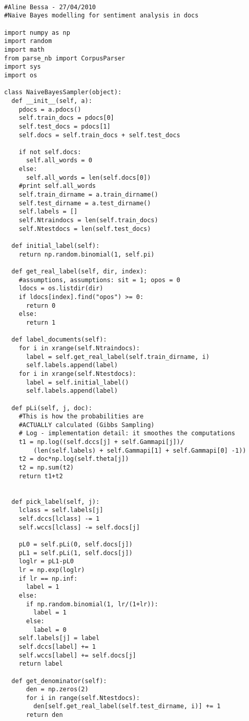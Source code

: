 \begin{lstlisting}

#Aline Bessa - 27/04/2010
#Naive Bayes modelling for sentiment analysis in docs

import numpy as np
import random
import math
from parse_nb import CorpusParser
import sys
import os

class NaiveBayesSampler(object):
  def __init__(self, a):
    pdocs = a.pdocs()
    self.train_docs = pdocs[0]
    self.test_docs = pdocs[1]
    self.docs = self.train_docs + self.test_docs

    if not self.docs: 
      self.all_words = 0
    else:
      self.all_words = len(self.docs[0])
    #print self.all_words
    self.train_dirname = a.train_dirname()
    self.test_dirname = a.test_dirname()
    self.labels = [] 
    self.Ntraindocs = len(self.train_docs)
    self.Ntestdocs = len(self.test_docs)

  def initial_label(self):
    return np.random.binomial(1, self.pi)

  def get_real_label(self, dir, index):
    #assumptions, assumptions: sit = 1; opos = 0
    ldocs = os.listdir(dir)
    if ldocs[index].find("opos") >= 0:
      return 0
    else:
      return 1

  def label_documents(self):
    for i in xrange(self.Ntraindocs):
      label = self.get_real_label(self.train_dirname, i)
      self.labels.append(label)
    for i in xrange(self.Ntestdocs):
      label = self.initial_label()
      self.labels.append(label)

  def pLi(self, j, doc):
    #This is how the probabilities are 
    #ACTUALLY calculated (Gibbs Sampling)   
    # Log - implementation detail: it smoothes the computations
    t1 = np.log((self.dccs[j] + self.Gammapi[j])/
        (len(self.labels) + self.Gammapi[1] + self.Gammapi[0] -1))
    t2 = doc*np.log(self.theta[j])
    t2 = np.sum(t2)
    return t1+t2


  def pick_label(self, j):
    lclass = self.labels[j]
    self.dccs[lclass] -= 1 
    self.wccs[lclass] -= self.docs[j] 

    pL0 = self.pLi(0, self.docs[j]) 
    pL1 = self.pLi(1, self.docs[j])
    loglr = pL1-pL0
    lr = np.exp(loglr)
    if lr == np.inf:
      label = 1
    else:
      if np.random.binomial(1, lr/(1+lr)):
        label = 1
      else:
        label = 0
    self.labels[j] = label
    self.dccs[label] += 1
    self.wccs[label] += self.docs[j]
    return label
  
  def get_denominator(self):
      den = np.zeros(2)
      for i in range(self.Ntestdocs):
        den[self.get_real_label(self.test_dirname, i)] += 1
      return den


\end{lstlisting}
